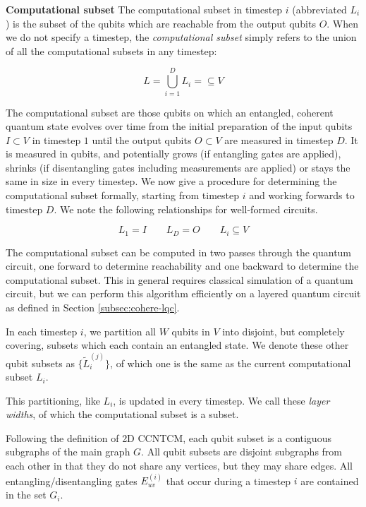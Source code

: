 \begin{definition}{\textbf{Computational subset}}
The computational subset in timestep $i$ (abbreviated $L_i$) is the subset of the qubits
which are reachable from the output qubits $O$.
When we do not specify a timestep, the \emph{computational subset} simply
refers to the union of all the computational subsets in any timestep:

\begin{equation}
L = \bigcup_{i=1}^D L_i = \subseteq V
\end{equation}
\end{definition}

The computational subset are those qubits on which an entangled, coherent
quantum state evolves over time from
the initial preparation of the input qubits $I \subset V$ in timestep $1$
until the output qubits $O \subset V$ are
measured in timestep $D$.
It is measured in qubits, and potentially grows (if entangling gates are applied), shrinks
(if disentangling gates including measurements are applied) or stays the same in size
in every timestep. We now give a procedure for determining the computational subset formally,
starting from timestep $i$ and working forwards to timestep $D$. We note the following
relationships for well-formed circuits.

\begin{equation}
L_1 = I \qquad L_D = O \qquad L_i \subseteq V
\end{equation}

The computational subset can be computed in two passes through
the quantum circuit, one forward to determine reachability and one backward
to determine the computational subset. This in general requires classical simulation of a
quantum circuit, but we can perform this algorithm efficiently on a
layered quantum circuit as defined in Section \ref{subsec:cohere-lqc}.

In each timestep $i$, we partition all $W$ qubits in $V$ into disjoint, but completely
covering, subsets which each contain an entangled state. We denote these other
qubit subsets as $\{\tilde{L}^{(j)}_i\}$, of which one is the same as the current
computational subset $L_i$.

This partitioning, like $L_i$, is updated in
every timestep.
We call these \emph{layer widths}, of which the computational subset is
a subset.

Following the definition of \textsf{2D CCNTCM}, each qubit subset is a
contiguous subgraphs of the main graph $G$. All qubit subsets are
disjoint subgraphs from each other in that they do not share any vertices,
but they may share edges. All entangling/disentangling gates $E^{(i)}_{uv}$
that occur during a timestep $i$ are contained in the set $G_i$.

